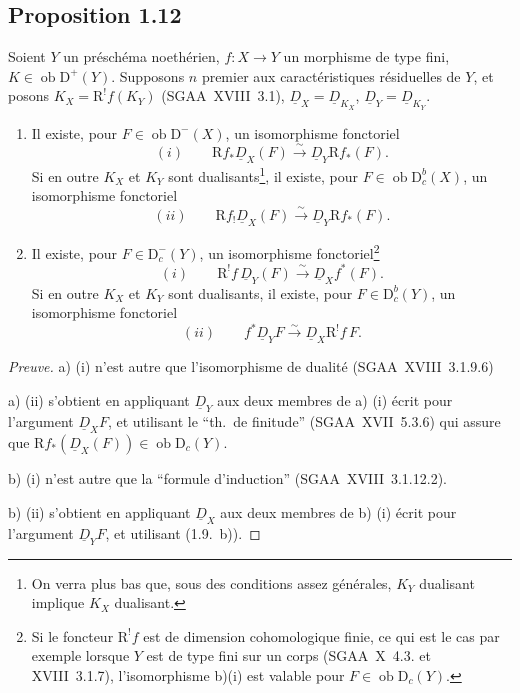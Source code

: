 \documentclass[11pt]{article}
\newcommand{\R}{\mathrm{R}}
\newcommand{\D}{\mathrm{D}}
\newcommand{\ob}{\operatorname{ob}}
\providecommand{\ob}{\operatorname{ob}}
\begin{document}
\subsection*{Proposition 1.12}
Soient $Y$ un préschéma noethérien, $f : X \to Y$ un morphisme de type fini, $K \in \ob \D^{+}(Y)$. Supposons $n$ premier aux caractéristiques résiduelles de $Y$, et posons $K_X = \R^{!}f(K_Y)$ (SGAA~XVIII~3.1), $\underline{D}_X = \underline{D}_{K_X}$, $\underline{D}_Y = \underline{D}_{K_Y}$.
\begin{enumerate}
\item[a)] Il existe, pour $F \in \ob \D^{-}(X)$, un isomorphisme fonctoriel
\[
(i) \qquad \R f_{*} \underline{D}_X(F) \xrightarrow{\sim} \underline{D}_Y \R f_{*}(F).
\]
Si en outre $K_X$ et $K_Y$ sont dualisants\footnote{On verra plus bas que, sous des conditions assez générales, $K_Y$ dualisant implique $K_X$ dualisant.}, il existe, pour $F \in \ob \D_c^{b}(X)$, un isomorphisme fonctoriel
\[
(ii) \qquad \R f_{!} \underline{D}_X(F) \xrightarrow{\sim} \underline{D}_Y \R f_{*}(F).
\]
\item[b)] Il existe, pour $F \in \D_c^{-}(Y)$, un isomorphisme fonctoriel\footnote{Si le foncteur $\R^{!}f$ est de dimension cohomologique finie, ce qui est le cas par exemple lorsque $Y$ est de type fini sur un corps (SGAA~X~4.3. et XVIII~3.1.7), l'isomorphisme b)(i) est valable pour $F \in \ob \D_c(Y)$.}
\[
(i) \qquad \R^{!}f \, \underline{D}_Y(F) \xrightarrow{\sim} \underline{D}_X f^{*}(F).
\]
Si en outre $K_X$ et $K_Y$ sont dualisants\footnotemark[3], il existe, pour $F \in \D_c^{b}(Y)$, un isomorphisme fonctoriel
\[
(ii) \qquad f^{*} \underline{D}_Y F \xrightarrow{\sim} \underline{D}_X \R^{!}f \, F.
\]
\end{enumerate}

\begin{proof}[Preuve]
a) (i) n'est autre que l'isomorphisme de dualité (SGAA~XVIII~3.1.9.6)

a) (ii) s'obtient en appliquant $\underline{D}_Y$ aux deux membres de a) (i) écrit pour l'argument $\underline{D}_X F$, et utilisant le ``th.~de finitude'' (SGAA~XVII~5.3.6) qui assure que $\R f_{*}(\underline{D}_X(F)) \in \ob \D_c(Y)$.

b) (i) n'est autre que la ``formule d'induction'' (SGAA~XVIII~3.1.12.2).

b) (ii) s'obtient en appliquant $\underline{D}_X$ aux deux membres de b) (i) écrit pour l'argument $\underline{D}_Y F$, et utilisant (1.9.~b)).
\end{proof}
\end{document}
